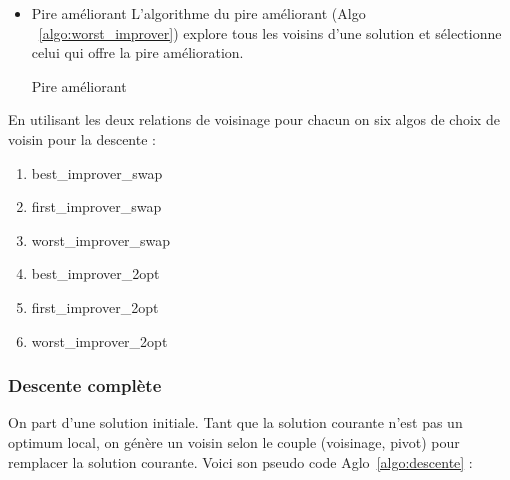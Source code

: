 \begin{itemize}
\begin{algorithm}
\begin{algorithmic}[1]
			\State {}
			\EndIf
			\EndFor
		\State {}
			\EndFunction
			
		\end{algorithmic}
	\end{algorithm}
	
	\item Pire améliorant
	L'algorithme du pire améliorant (Algo ~\ref{algo:worst_improver}) explore tous les voisins d'une solution et sélectionne celui qui offre la pire amélioration.
	
		\begin{algorithm}
		\caption{Pire améliorant}
		\label{algo:worst_improver}
		\begin{algorithmic}[1]
			\Statex
			
			
			                
			\EndIf
			\EndFor
			\State {}
			\EndFunction
			
		\end{algorithmic}
	\end{algorithm}
	
\end{itemize}

En utilisant les deux relations de voisinage pour chacun on six algos de choix de voisin pour la descente :
\begin{enumerate}
	\item best\_improver\_swap
	\item first\_improver\_swap
	\item worst\_improver\_swap
	\item best\_improver\_2opt
	\item first\_improver\_2opt
	\item worst\_improver\_2opt
\end{enumerate}

\subsubsection{Descente complète}
On part d’une solution initiale. Tant que la solution courante n’est pas un optimum local, on génère un voisin selon le couple (voisinage, pivot) pour remplacer la solution courante. Voici son pseudo code Aglo~\ref{algo:descente} :

